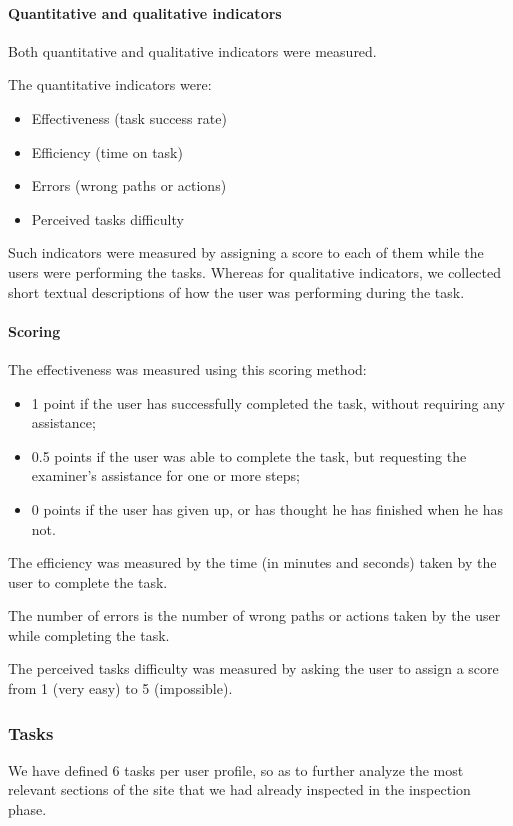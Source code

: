     \paragraph{Quantitative and qualitative indicators}
    Both quantitative and qualitative indicators were measured. 
    
    The quantitative indicators were:
    \begin{itemize}
        \item Effectiveness (task success rate)
        \item Efficiency (time on task)
        \item Errors (wrong paths or actions)
        \item Perceived tasks difficulty
    \end{itemize}

    Such indicators were measured by assigning a score to each of them while the users were performing the tasks. Whereas for qualitative indicators, we collected short textual descriptions of how the user was performing during the task.

    \paragraph{Scoring}
    The effectiveness was measured using this scoring method:
    \begin{itemize}
        \item 1 point if the user has successfully completed the task, without requiring any assistance;
        \item 0.5 points if the user was able to complete the task, but requesting the examiner's assistance for one or more steps;
        \item 0 points if the user has given up, or has thought he has finished when he has not.
    \end{itemize}

    The efficiency was measured by the time (in minutes and seconds) taken by the user to complete the task.

    The number of errors is the number of wrong paths or actions taken by the user while completing the task.

    The perceived tasks difficulty was measured by asking the user to assign a score from 1 (very easy)  to 5 (impossible).

    \subsubsection{Tasks}
    We have defined 6 tasks per user profile, so as to further analyze the most relevant sections of the site that we had already inspected in the inspection phase.

